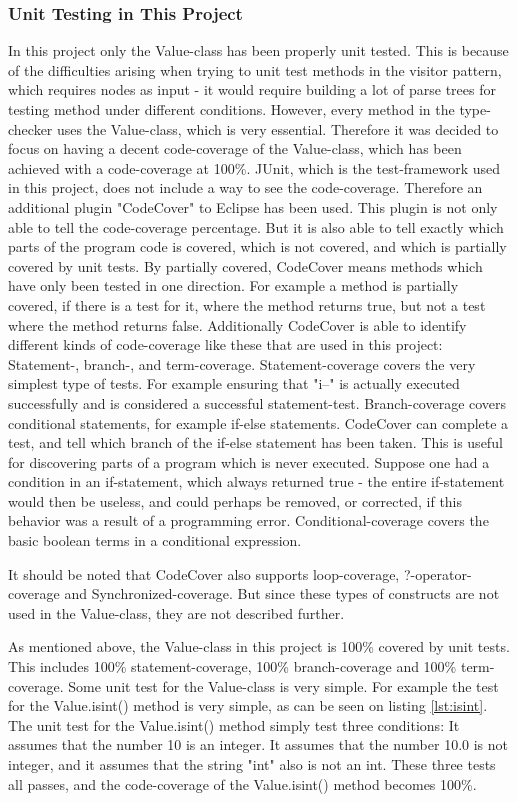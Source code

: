 \subsubsection{Unit Testing in This Project}
In this project only the Value-class has been properly unit tested. This is because of the difficulties arising when trying to unit test methods in the visitor pattern, which requires nodes as input - it would require building a lot of parse trees for testing method under different conditions. However, every method in the type-checker uses the Value-class, which is very essential. Therefore it was decided to focus on having a decent code-coverage of the Value-class, which has been achieved with a code-coverage at 100\%. JUnit, which is the test-framework used in this project, does not include a way to see the code-coverage. Therefore an additional plugin "CodeCover" \citep{codecover} to Eclipse has been used. This plugin is not only able to tell the code-coverage percentage. But it is also able to tell exactly which parts of the program code is covered, which is not covered, and which is partially covered by unit tests. By partially covered, CodeCover means methods which have only been tested in one direction. For example a method is partially covered, if there is a test for it, where the method returns true, but not a test where the method returns false. Additionally CodeCover is able to identify different kinds of code-coverage like these that are used in this project: Statement-, branch-, and term-coverage. Statement-coverage covers the very simplest type of tests. For example ensuring that "i--" is actually executed successfully and is considered a successful statement-test.
Branch-coverage covers conditional statements, for example if-else statements. CodeCover can complete a test, and tell which branch of the if-else statement has been taken. This is useful for discovering parts of a program which is never executed. Suppose one had a condition in an if-statement, which always returned true - the entire if-statement would then be useless, and could perhaps be removed, or corrected, if this behavior was a result of a programming error. Conditional-coverage covers the basic boolean terms in a conditional expression. 

It should be noted that CodeCover also supports loop-coverage, ?-operator-coverage and Synchronized-coverage. But since these types of constructs are not used in the Value-class, they are not described further. 

As mentioned above, the Value-class in this project is 100\% covered by unit tests. This includes 100\% statement-coverage, 100\% branch-coverage and 100\% term-coverage. Some unit test for the Value-class is very simple. For example the test for the Value.isint() method is very simple, as can be seen on listing \ref{lst:isint}. The unit test for the Value.isint() method simply test three conditions: It assumes that the number 10 is an integer. It assumes that the number 10.0 is not integer, and it assumes that the string "int" also is not an int. These three tests all passes, and the code-coverage of the Value.isint() method becomes 100\%. 

